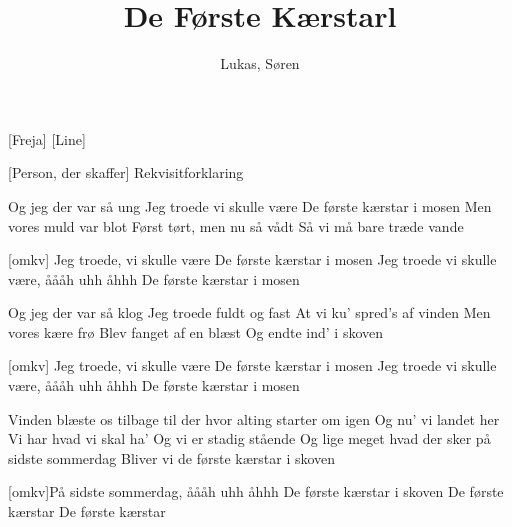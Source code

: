 \documentclass[a4paper,11pt]{article}
\title{De Første Kærstarl}
\author{Lukas, Søren}
\begin{document}
\maketitle

\begin{roles}
    [Freja]
    [Line]
\end{roles}

\begin{props}
    [Person, der skaffer] Rekvisitforklaring
\end{props}

\begin{song}
   Og jeg der var så ung
Jeg troede vi skulle være
De første kærstar i mosen
Men vores muld var blot
Først tørt, men nu så vådt
Så vi må bare træde vande

  [omkv] Jeg troede, vi skulle være
De første kærstar i mosen
Jeg troede vi skulle være, åååh uhh åhhh
De første kærstar i mosen

 Og jeg der var så klog
Jeg troede fuldt og fast
At vi ku’ spred’s af vinden
Men vores kære frø
Blev fanget af en blæst
Og endte ind’ i skoven

 [omkv] Jeg troede, vi skulle være
De første kærstar i mosen
Jeg troede vi skulle være, åååh uhh åhhh
De første kærstar i mosen

 Vinden blæste os tilbage til der hvor alting starter om igen
Og nu’ vi landet her
Vi har hvad vi skal ha’
Og vi er stadig stående
Og lige meget hvad der sker på sidste sommerdag
Bliver vi de første kærstar i skoven

 [omkv]På sidste sommerdag, åååh uhh åhhh
De første kærstar i skoven
De første kærstar
De første kærstar

\end{song}
\end{document}
